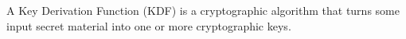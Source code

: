 \documentclass[a4paper, 12pt]{book} %
\begin{document}
A Key Derivation Function (KDF) is a cryptographic algorithm that turns some input secret material into one or more cryptographic keys.

    












\cite{adamson2012set}







\printindex
\end{document}
